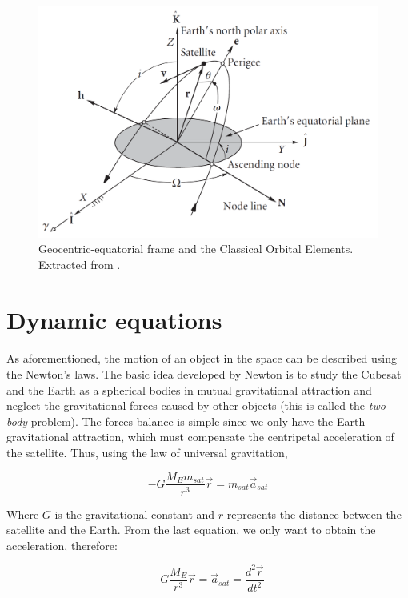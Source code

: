 \begin{figure}[H]
\centering
\includegraphics[scale=.3]{./Geometry/fig-Ch1-Geometry/COE.png}
\caption{Geocentric-equatorial frame and the Classical Orbital Elements. Extracted from \cite{Howard}.}
\label{fig:COE}
\end{figure}

\section{Dynamic equations}
\paragraph{}
As aforementioned, the motion of an object in the space can be described using the Newton's laws. The basic idea developed by Newton is to study the Cubesat and the Earth as a spherical bodies in mutual gravitational attraction and neglect the gravitational forces caused by other objects (this is called the \textit{two body} problem). The forces balance is simple since we only have the Earth gravitational attraction, which must compensate the centripetal acceleration of the satellite. Thus, using the law of universal gravitation,

\begin{equation}
-G\frac{M_{E}m_{sat}}{r^3}\vec{r}=m_{sat}\vec{a}_{sat}
\end{equation}

Where $G$ is the gravitational constant and $r$ represents the distance between the satellite and the Earth. From the last equation, we only want to obtain the acceleration, therefore:

\begin{equation}
-G\frac{M_{E}}{r^3}\vec{r}=\vec{a}_{sat}=\frac{d^2 \vec{r}}{d t^2}
\end{equation}

